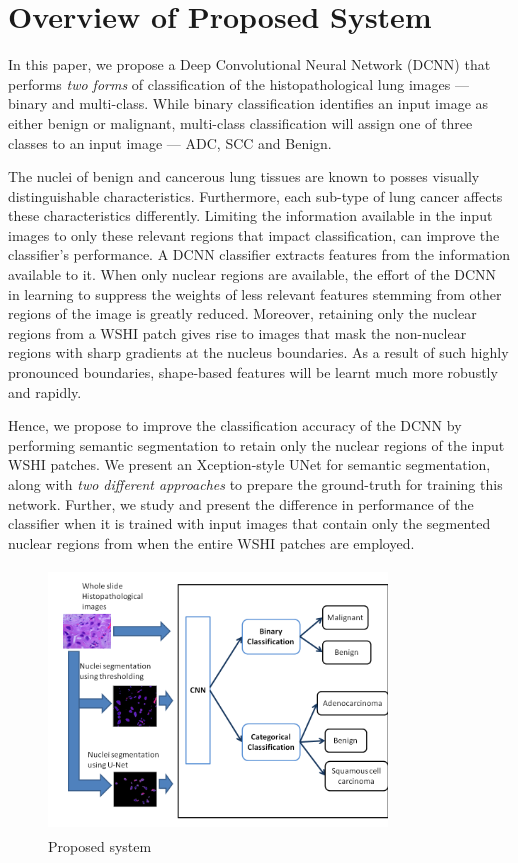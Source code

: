 \documentclass{comjnl}
\begin{document}
\section{Overview of Proposed System}

In this paper, we propose a Deep Convolutional Neural Network (DCNN) that performs \emph{two forms} of classification of the histopathological lung images --- binary and multi-class. While binary classification identifies an input  image as either benign or malignant, multi-class classification will assign one of three classes to an input image --- ADC, SCC and Benign. 

The nuclei of benign and cancerous lung tissues are known to posses visually distinguishable characteristics. Furthermore, each sub-type of lung cancer affects these characteristics differently. Limiting the information available in the input images to only these relevant regions that impact classification, can improve the classifier's performance. A DCNN classifier extracts features from the information available to it. When only nuclear regions are available, the effort of the DCNN in learning to suppress the weights of less relevant features stemming from other regions of the image is greatly reduced. Moreover, retaining only the nuclear regions from a WSHI patch gives rise to images that mask the non-nuclear regions with sharp gradients at the nucleus boundaries. As a result of such highly pronounced boundaries, shape-based features will be learnt much more robustly and rapidly.

Hence, we propose to improve the classification accuracy of the DCNN by performing semantic segmentation to retain only the nuclear regions of the input WSHI patches. We present an Xception-style UNet for semantic segmentation, along with \emph{two different approaches} to prepare the ground-truth for training this network. Further, we study and present the difference in performance of the classifier when it is trained with input images that contain only the segmented nuclear regions from when the entire WSHI patches are employed.  

\begin{figure}[htbp]
\centerline{\includegraphics[width=9cm, height=7cm]{./figures/proposed_system.png}}
\caption{Proposed system}
\label{proposed sys}
\end{figure}
\end{document}
